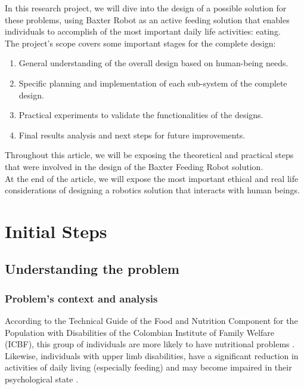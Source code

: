 \documentclass[11pt]{report} %
\begin{document}
In this research project, we will dive into the design of a possible solution for these problems, using Baxter Robot as an active feeding solution that enables individuals to accomplish of the most important daily life activities: eating.\\

The project's scope covers some important stages for the complete design: \\

\begin{enumerate}
    \item General understanding of the overall design based on human-being needs.
    \item Specific planning and implementation of each sub-system of the complete design.
    \item Practical experiments to validate the functionalities of the designs.
    \item Final results analysis and next steps for future improvements.
\end{enumerate}

Throughout this article, we will be exposing the theoretical and practical steps that were involved in the design of the Baxter Feeding Robot solution.\\

At the end of the article, we will expose the most important ethical and real life considerations of designing a robotics solution that interacts with human beings.


\chapter{Initial Steps}

\section{Understanding the problem}

\subsection{Problem's context and analysis}

According to the Technical Guide of the Food and Nutrition Component for the Population with Disabilities of the Colombian Institute of Family Welfare (ICBF), this group of individuals are more likely to have nutritional problems \citep{cite_ICBF_technical_article}. Likewise, individuals with upper limb disabilities, have a significant reduction in activities of daily living (especially feeding) and may become impaired in their psychological state \citep{cite_upper_limb_disabilities_self_steem}.\\
\end{document}

